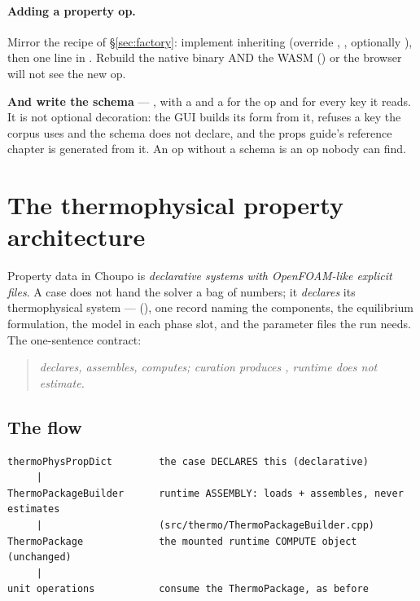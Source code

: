 \documentclass[11pt,a4paper]{article}
\begin{document}
\paragraph{Adding a property op.} Mirror the recipe of
\S\ref{sec:factory}: implement  inheriting
 (override , ,
optionally ), then one  line in
. Rebuild the native binary AND the
WASM () or the browser will not see the new op.

\textbf{And write the schema} --- ,
with a  and a  for the op and for every key it
reads.  It is not optional decoration: the GUI builds its form from it,
 refuses a key the corpus uses and the schema
does not declare, and the props guide's reference chapter is generated from
it.  An op without a schema is an op nobody can find.

\section{The thermophysical property architecture}\label{sec:property-architecture}

Property data in Choupo is \emph{declarative systems with OpenFOAM-like
explicit files}.  A case does not hand the solver a bag of numbers; it
\emph{declares} its thermophysical system --- 
(), one
record naming the components, the equilibrium formulation, the model in
each phase slot, and the parameter files the run needs.  The one-sentence
contract:

\begin{quote}\itshape
{} declares,  assembles,
 computes; curation produces , runtime does not
estimate.
\end{quote}

\subsection{The flow}

\begin{lstlisting}
thermoPhysPropDict        the case DECLARES this (declarative)
     |
ThermoPackageBuilder      runtime ASSEMBLY: loads + assembles, never estimates
     |                    (src/thermo/ThermoPackageBuilder.cpp)
ThermoPackage             the mounted runtime COMPUTE object (unchanged)
     |
unit operations           consume the ThermoPackage, as before
\end{lstlisting}
\end{document}
